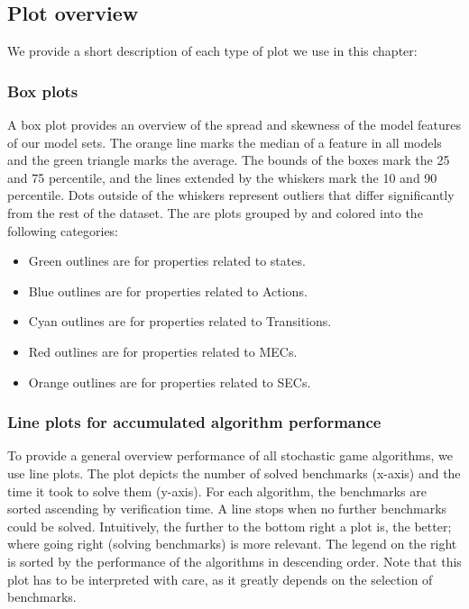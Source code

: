 \subsection{Plot overview} \label{subsec:plots}
We provide a short description of each type of plot we use in this chapter:
\subsubsection*{Box plots} \label{plot:boxplot}
A box plot provides an overview of the spread and skewness of the model features of our model sets.
The orange line marks the median of a feature in all models and the green triangle marks the
average. The bounds of the boxes mark the 25 and 75 percentile, and the lines extended
by the whiskers mark the 10 and 90 percentile. Dots outside of the whiskers represent
outliers that differ significantly from the rest of the dataset.
The are plots grouped by and colored into the following categories:
\begin{itemize}
    \item Green outlines are for properties related to states. 
    \item Blue outlines are for properties related to Actions. 
    \item Cyan outlines are for properties related to Transitions.
    \item Red outlines are for properties related to MECs.
    \item Orange outlines are for properties related to SECs. 
\end{itemize}

\subsubsection*{Line plots for accumulated algorithm performance} \label{plot:starplot}
To provide a general overview performance of all stochastic game algorithms, we use line plots.
The plot depicts the number of solved benchmarks (x-axis) and the time it took to solve them (y-axis). 
For each algorithm, the benchmarks are sorted ascending by verification time. A line stops when no further benchmarks could be solved.
Intuitively, the further to the bottom right a plot is, the better; where going right (solving benchmarks) is more relevant.
The legend on the right is sorted by the performance of the algorithms in descending order.
Note that this plot has to be interpreted with care, as it greatly depends on the selection of benchmarks.

